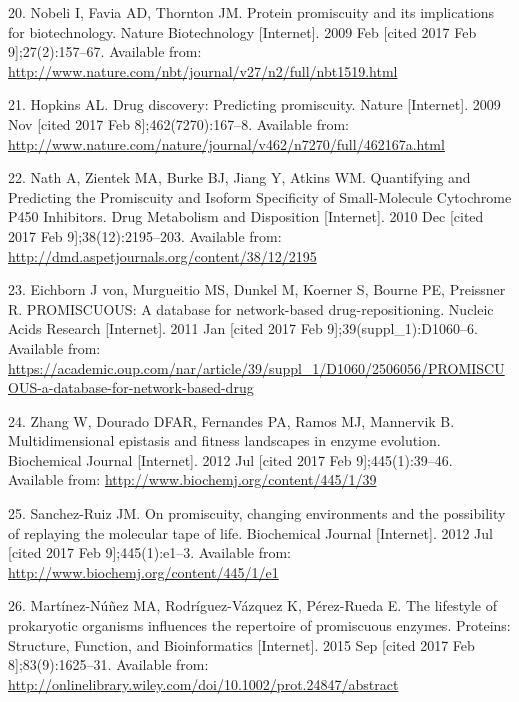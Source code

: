 \documentclass[12pt,twoside]{reedthesis}
\begin{document}
  \hypertarget{ref-nobeli_protein_2009}{}
  20. Nobeli I, Favia AD, Thornton JM. Protein promiscuity and its
  implications for biotechnology. Nature Biotechnology {[}Internet{]}.
  2009 Feb {[}cited 2017 Feb 9{]};27(2):157--67. Available from:
  \url{http://www.nature.com/nbt/journal/v27/n2/full/nbt1519.html}
  
  \hypertarget{ref-hopkins_drug_2009}{}
  21. Hopkins AL. Drug discovery: Predicting promiscuity. Nature
  {[}Internet{]}. 2009 Nov {[}cited 2017 Feb 8{]};462(7270):167--8.
  Available from:
  \url{http://www.nature.com/nature/journal/v462/n7270/full/462167a.html}
  
  \hypertarget{ref-nath_quantifying_2010}{}
  22. Nath A, Zientek MA, Burke BJ, Jiang Y, Atkins WM. Quantifying and
  Predicting the Promiscuity and Isoform Specificity of Small-Molecule
  Cytochrome P450 Inhibitors. Drug Metabolism and Disposition
  {[}Internet{]}. 2010 Dec {[}cited 2017 Feb 9{]};38(12):2195--203.
  Available from: \url{http://dmd.aspetjournals.org/content/38/12/2195}
  
  \hypertarget{ref-von_eichborn_promiscuous:_2011}{}
  23. Eichborn J von, Murgueitio MS, Dunkel M, Koerner S, Bourne PE,
  Preissner R. PROMISCUOUS: A database for network-based
  drug-repositioning. Nucleic Acids Research {[}Internet{]}. 2011 Jan
  {[}cited 2017 Feb 9{]};39(suppl\_1):D1060--6. Available from:
  \url{https://academic.oup.com/nar/article/39/suppl_1/D1060/2506056/PROMISCUOUS-a-database-for-network-based-drug}
  
  \hypertarget{ref-zhang_multidimensional_2012}{}
  24. Zhang W, Dourado DFAR, Fernandes PA, Ramos MJ, Mannervik B.
  Multidimensional epistasis and fitness landscapes in enzyme evolution.
  Biochemical Journal {[}Internet{]}. 2012 Jul {[}cited 2017 Feb
  9{]};445(1):39--46. Available from:
  \url{http://www.biochemj.org/content/445/1/39}
  
  \hypertarget{ref-sanchez-ruiz_promiscuity_2012}{}
  25. Sanchez-Ruiz JM. On promiscuity, changing environments and the
  possibility of replaying the molecular tape of life. Biochemical Journal
  {[}Internet{]}. 2012 Jul {[}cited 2017 Feb 9{]};445(1):e1--3. Available
  from: \url{http://www.biochemj.org/content/445/1/e1}
  
  \hypertarget{ref-martinez-nunez_lifestyle_2015}{}
  26. Martínez-Núñez MA, Rodríguez-Vázquez K, Pérez-Rueda E. The lifestyle
  of prokaryotic organisms influences the repertoire of promiscuous
  enzymes. Proteins: Structure, Function, and Bioinformatics
  {[}Internet{]}. 2015 Sep {[}cited 2017 Feb 8{]};83(9):1625--31.
  Available from:
  \url{http://onlinelibrary.wiley.com/doi/10.1002/prot.24847/abstract}
  
\end{document}
